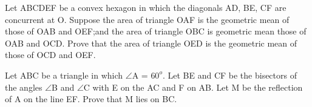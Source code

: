 \item Let ABCDEF be a convex hexagon in which the diagonals AD, BE, CF are concurrent at O. Suppose the area of triangle OAF is the geometric mean of those of OAB and OEF;and the area of triangle OBC is geometric mean those of OAB and OCD. Prove that the area of triangle OED is the geometric mean of those of OCD and OEF.

\item Let ABC be a triangle in which $\angle$A = $60^{o}$. Let BE and CF be the bisectors of the angles $\angle$B and 
$\angle$C with E on the AC and F on AB. Let M be the reflection of A on the line EF. Prove that M lies on BC.

